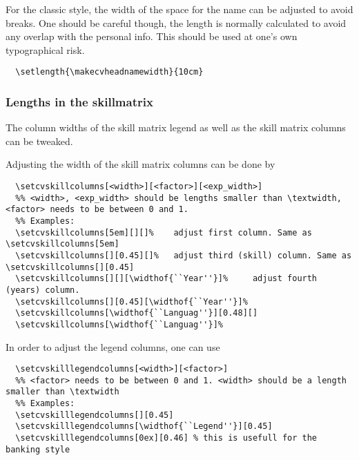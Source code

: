 \documentclass[a4paper,11pt]{article}
\newcommand{\Code}[1]{\lstinline!#1!~} %
\begin{document}
For the classic style, the width of the space for the name can be adjusted to avoid breaks. 
One should be careful though, the length is normally calculated to avoid any overlap with the personal info. This should be used at one's own typographical risk.
\begin{lstlisting}
  \setlength{\makecvheadnamewidth}{10cm}
\end{lstlisting}



\subsubsection{Lengths in the skillmatrix}
\label{section:length:skillmatrix}
The column widths of the skill matrix legend as well as the skill matrix columns can be tweaked. 

Adjusting the width of the skill matrix columns can be done by
\begin{lstlisting}
  \setcvskillcolumns[<width>][<factor>][<exp_width>]
  %% <width>, <exp_width> should be lengths smaller than \textwidth, <factor> needs to be between 0 and 1.
  %% Examples:
  \setcvskillcolumns[5em][][]%    adjust first column. Same as \setcvskillcolumns[5em]
  \setcvskillcolumns[][0.45][]%   adjust third (skill) column. Same as \setcvskillcolumns[][0.45]
  \setcvskillcolumns[][][\widthof{``Year''}]%     adjust fourth (years) column.
  \setcvskillcolumns[][0.45][\widthof{``Year''}]%
  \setcvskillcolumns[\widthof{``Languag''}][0.48][]
  \setcvskillcolumns[\widthof{``Languag''}]%
\end{lstlisting}

In order to adjust the legend columns, one can use
\begin{lstlisting}
  \setcvskilllegendcolumns[<width>][<factor>]
  %% <factor> needs to be between 0 and 1. <width> should be a length smaller than \textwidth
  %% Examples:
  \setcvskilllegendcolumns[][0.45]
  \setcvskilllegendcolumns[\widthof{``Legend''}][0.45]
  \setcvskilllegendcolumns[0ex][0.46] % this is usefull for the banking style
\end{lstlisting}
\end{document}
